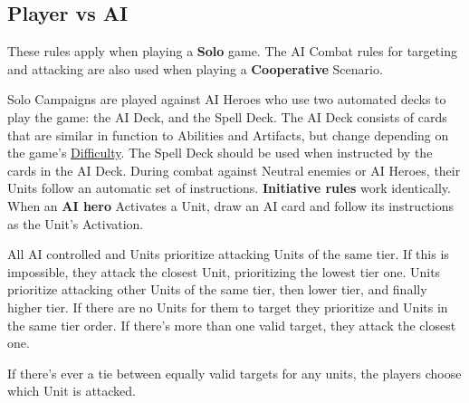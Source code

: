 \subsection*{\hypertarget{AIrules}{Player vs AI}}
These rules apply when playing a \textbf{Solo} game.
The AI Combat rules for targeting and attacking are also used when playing a \textbf{Cooperative} Scenario.\par
Solo Campaigns are played against AI Heroes who use two automated decks to play the game: the AI Deck, and the Spell Deck.
The AI Deck consists of cards that are similar in function to Abilities and Artifacts, but change depending on the game's \hyperlink{Difficulty}{Difficulty}.
The Spell Deck should be used when instructed by the cards in the AI Deck.
During combat against Neutral enemies or AI Heroes, their Units follow an automatic set of instructions.
\textbf{Initiative rules} work identically.
When an \textbf{AI hero} Activates a Unit, draw an AI card and follow its instructions as the Unit's Activation.\par
All AI controlled  and  Units prioritize attacking Units of the same tier.
If this is impossible, they attack the closest Unit, prioritizing the lowest tier one.
 Units prioritize attacking other  Units of the same tier, then lower tier, and finally higher tier.
If there are no  Units for them to target they prioritize  and  Units in the same tier order.
If there's more than one valid target, they attack the closest one.\par
If there's ever a tie between equally valid targets for any units, the players choose which Unit is attacked.

